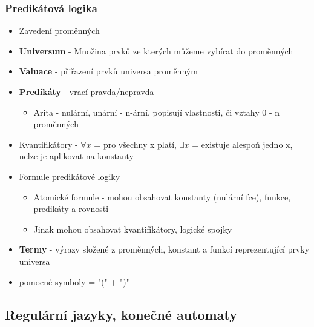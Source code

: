 \documentclass[10pt,a4paper]{article}
\begin{document}
\subsubsection{Predikátová logika}
\begin{itemize}
\item Zavedení proměnných
\item \textbf{Universum} - Množina prvků ze kterých můžeme vybírat do proměnných
\item \textbf{Valuace} - přiřazení prvků universa proměnným
\item \textbf{Predikáty} - vrací pravda/nepravda
\begin{itemize}
\item Arita - nulární, unární - n-ární, popisují vlastnosti, či vztahy 0 - n proměnných
\end{itemize}
\item Kvantifikátory - $\forall x$ = pro všechny x platí, $\exists x$ = existuje alespoň jedno x, nelze je aplikovat na konstanty
\item Formule predikátové logiky
\begin{itemize}
\item Atomické formule - mohou obsahovat konstanty (nulární fce), funkce, predikáty a rovnosti
\item Jinak mohou obsahovat kvantifikátory, logické spojky
\end{itemize}
\item \textbf{Termy} - výrazy složené z proměnných, konstant a funkcí reprezentující prvky universa
\item pomocné symboly = "(" + ")"
\end{itemize}

\subsection{Regulární jazyky, konečné automaty}
\end{document}

